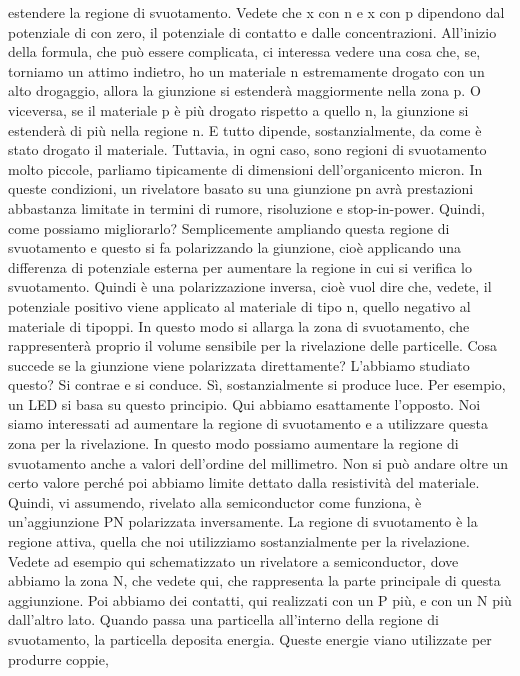 estendere la regione di svuotamento. Vedete che x con n e x con p dipendono dal potenziale di con zero, il potenziale di contatto e dalle concentrazioni. All'inizio della formula, che può essere complicata, ci interessa vedere una cosa che, se, torniamo un attimo indietro, ho un materiale n estremamente drogato con un alto drogaggio, allora la giunzione si estenderà maggiormente nella zona p. O viceversa, se il materiale p è più drogato rispetto a quello n, la giunzione si estenderà di più nella regione n. E tutto dipende, sostanzialmente, da come è stato drogato il materiale. Tuttavia, in ogni caso, sono regioni di svuotamento molto piccole, parliamo tipicamente di dimensioni dell'organicento micron. In queste condizioni, un rivelatore basato su una giunzione pn avrà prestazioni abbastanza limitate in termini di rumore, risoluzione e stop-in-power. Quindi, come possiamo migliorarlo? Semplicemente ampliando questa regione di svuotamento e questo si fa polarizzando la giunzione, cioè applicando una differenza di potenziale esterna per aumentare la regione in cui si verifica lo svuotamento. Quindi è una polarizzazione inversa, cioè vuol dire che, vedete, il potenziale positivo viene applicato al materiale di tipo n, quello negativo al materiale di tipoppi. In questo modo si allarga la zona di svuotamento, che rappresenterà proprio il volume sensibile per la rivelazione delle particelle. Cosa succede se la giunzione viene polarizzata direttamente? L'abbiamo studiato questo? Si contrae e si conduce. Sì, sostanzialmente si produce luce. Per esempio, un LED si basa su questo principio. Qui abbiamo esattamente l'opposto. Noi siamo interessati ad aumentare la regione di svuotamento e a utilizzare questa zona per la rivelazione. In questo modo possiamo aumentare la regione di svuotamento anche a valori dell'ordine del millimetro. Non si può andare oltre un certo valore perché poi abbiamo limite dettato dalla resistività del materiale. Quindi, vi assumendo, rivelato alla semiconductor come funziona, è un'aggiunzione PN polarizzata inversamente. La regione di svuotamento è la regione attiva, quella che noi utilizziamo sostanzialmente per la rivelazione. Vedete ad esempio qui schematizzato un rivelatore a semiconductor, dove abbiamo la zona N, che vedete qui, che rappresenta la parte principale di questa aggiunzione. Poi abbiamo dei contatti, qui realizzati con un P più, e con un N più dall'altro lato. Quando passa una particella all'interno della regione di svuotamento, la particella deposita energia. Queste energie viano utilizzate per produrre coppie, 

